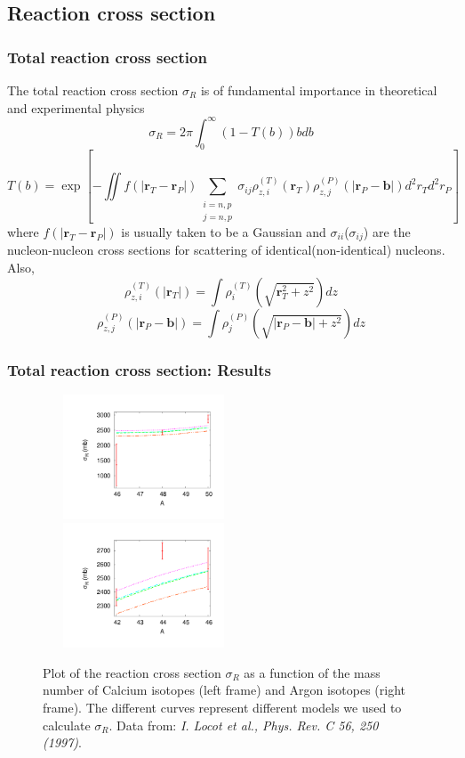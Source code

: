 \documentclass[10pt,serif]{beamer}
\newcommand{\bvec}[1]{\boldsymbol{#1}}
\newcommand{\rb}[1]{\left(#1\right)}
\newcommand{\abs}[1]{\left|#1\right|}
\begin{document}
\subsection{Reaction cross section}
\begin{frame}
\frametitle{Total reaction cross section}
The total reaction cross section $\sigma_R$ is of fundamental importance in theoretical and experimental physics
\begin{equation}
\sigma_R = 2 \pi \int_0^\infty \rb{ 1 - T(b) } b db
\end{equation}
\begin{equation}
T(b) = \exp \left[   -\iint f \rb{ \abs{\bvec{r}_T - \bvec{r}_P} } \sum_{\substack{i=n,p\\j=n,p}} \sigma_{ij} \rho^{\rb{T}}_{z,i} \rb{\bvec{r}_T} \rho^{\rb{P}}_{z,j} \rb{ \abs{\bvec{r}_P - \bvec{b}} } d^2 r_T d^2 r_P  \right]
\end{equation}
where $f \rb{ \abs{\bvec{r}_T - \bvec{r}_P} }$ is usually taken to be a Gaussian and $\sigma_{ii}$($\sigma_{ij}$) are the nucleon-nucleon cross sections for scattering of identical(non-identical) nucleons. Also,
\begin{equation}
\rho_{z,i}^{\rb{T}} \rb{\abs{\bvec{r}_T}} = \int \rho_i^{\rb{T}} \rb{ \sqrt{\bvec{r}^2_T + z^2} } dz
\end{equation}
\begin{equation}
\rho_{z,j}^{\rb{P}} \rb{\abs{\bvec{r}_P-\bvec{b}}} = \int \rho_j^{\rb{P}} \rb{ \sqrt{\abs{\bvec{r}_P-\bvec{b}} + z^2} } dz
\end{equation}
\end{frame}
\begin{frame}
\frametitle{Total reaction cross section: Results}
\begin{figure}[!h]
\centering
\includegraphics[width=6cm,height=3.7cm]{Ca.pdf}
\includegraphics[width=6cm,height=3.7cm]{Ar.pdf}
\caption{Plot of the reaction cross section $\sigma_R$ as a function of the mass number of Calcium isotopes (left frame) and Argon isotopes (right frame). The different curves represent different models we used to calculate $\sigma_R$. Data from: \emph{I. Locot et al., Phys. Rev. C 56, 250 (1997)}.}
\end{figure}
\end{frame}
\end{document}
